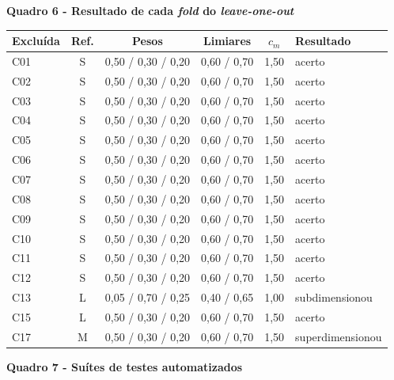\begin{center}
\textbf{Quadro 6 - Resultado de cada \textit{fold} do \textit{leave-one-out}}
\end{center}

\begin{center}
\footnotesize
\begin{tabular}{lccccl}
\hline
\textbf{Excluída} & \textbf{Ref.} & \textbf{Pesos} & \textbf{Limiares} & $c_m$ & \textbf{Resultado} \\
\hline
	C01 & S & 0,50 / 0,30 / 0,20 & 0,60 / 0,70 & 1,50 & acerto \\
	C02 & S & 0,50 / 0,30 / 0,20 & 0,60 / 0,70 & 1,50 & acerto \\
	C03 & S & 0,50 / 0,30 / 0,20 & 0,60 / 0,70 & 1,50 & acerto \\
	C04 & S & 0,50 / 0,30 / 0,20 & 0,60 / 0,70 & 1,50 & acerto \\
	C05 & S & 0,50 / 0,30 / 0,20 & 0,60 / 0,70 & 1,50 & acerto \\
	C06 & S & 0,50 / 0,30 / 0,20 & 0,60 / 0,70 & 1,50 & acerto \\
	C07 & S & 0,50 / 0,30 / 0,20 & 0,60 / 0,70 & 1,50 & acerto \\
	C08 & S & 0,50 / 0,30 / 0,20 & 0,60 / 0,70 & 1,50 & acerto \\
	C09 & S & 0,50 / 0,30 / 0,20 & 0,60 / 0,70 & 1,50 & acerto \\
	C10 & S & 0,50 / 0,30 / 0,20 & 0,60 / 0,70 & 1,50 & acerto \\
	C11 & S & 0,50 / 0,30 / 0,20 & 0,60 / 0,70 & 1,50 & acerto \\
	C12 & S & 0,50 / 0,30 / 0,20 & 0,60 / 0,70 & 1,50 & acerto \\
	C13 & L & 0,05 / 0,70 / 0,25 & 0,40 / 0,65 & 1,00 & subdimensionou \\
	C15 & L & 0,50 / 0,30 / 0,20 & 0,60 / 0,70 & 1,50 & acerto \\
	C17 & M & 0,50 / 0,30 / 0,20 & 0,60 / 0,70 & 1,50 & superdimensionou \\
\hline
\end{tabular}
\end{center}


\begin{center}
\textbf{Quadro 7 - Suítes de testes automatizados}
\end{center}

